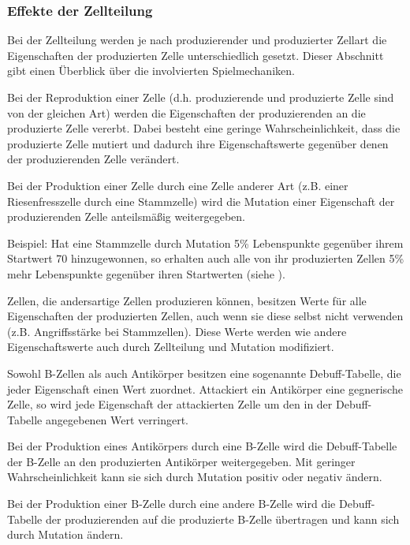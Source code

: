 \subsubsection{Effekte der Zellteilung}
\label{sec:zellteilung}

Bei der Zellteilung werden je nach produzierender und produzierter Zellart die
Eigenschaften der produzierten Zelle unterschiedlich gesetzt. Dieser Abschnitt
gibt einen Überblick über die involvierten Spielmechaniken.


Bei der Reproduktion einer Zelle (d.h. produzierende und produzierte Zelle
sind von der gleichen Art) werden die Eigenschaften der produzierenden an
die produzierte Zelle vererbt. Dabei besteht eine geringe Wahrscheinlichkeit,
dass die produzierte Zelle mutiert und dadurch ihre Eigenschaftswerte gegenüber
denen der produzierenden Zelle verändert.


Bei der Produktion einer Zelle durch eine Zelle anderer Art (z.B. einer
Riesenfresszelle durch eine Stammzelle) wird die Mutation einer Eigenschaft
der produzierenden Zelle anteilsmäßig weitergegeben.

Beispiel: Hat eine Stammzelle durch Mutation 5\% Lebenspunkte gegenüber ihrem
Startwert 70 hinzugewonnen, so erhalten auch alle von ihr produzierten Zellen
5\% mehr Lebenspunkte gegenüber ihren Startwerten (siehe
).

Zellen, die andersartige Zellen produzieren können, besitzen Werte für
alle Eigenschaften der produzierten Zellen, auch wenn sie diese selbst
nicht verwenden (z.B. Angriffsstärke bei Stammzellen). Diese Werte werden
wie andere Eigenschaftswerte auch durch Zellteilung und Mutation modifiziert.


Sowohl B-Zellen als auch Antikörper besitzen eine sogenannte Debuff-Tabelle,
die jeder Eigenschaft einen Wert zuordnet. Attackiert ein Antikörper eine
gegnerische Zelle, so wird jede Eigenschaft der attackierten Zelle um den
in der Debuff-Tabelle angegebenen Wert verringert.

Bei der Produktion eines Antikörpers durch eine B-Zelle wird die Debuff-Tabelle
der B-Zelle an den produzierten Antikörper weitergegeben. Mit geringer
Wahrscheinlichkeit kann sie sich durch Mutation positiv oder negativ ändern.

Bei der Produktion einer B-Zelle durch eine andere B-Zelle wird die
Debuff-Tabelle der produzierenden auf die produzierte B-Zelle übertragen
und kann sich durch Mutation ändern.

